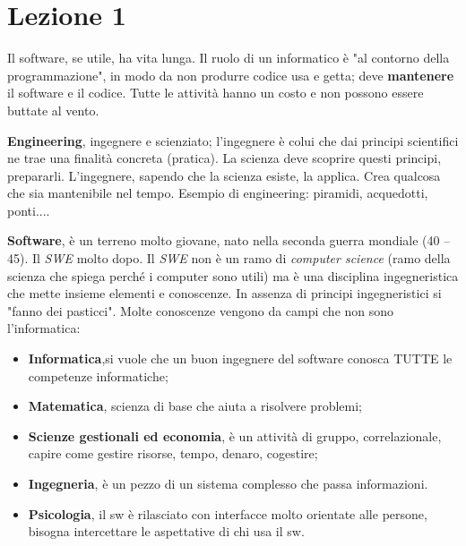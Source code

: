 





\section{Lezione 1}


Il software, se utile, ha vita lunga.
Il ruolo di un informatico è "al contorno della programmazione", in modo da non produrre codice usa e getta; deve \textbf{mantenere} il software e il codice. Tutte le attività hanno un costo e non possono essere buttate al vento.

\textbf{Engineering}, ingegnere e scienziato; l'ingegnere è colui che dai principi scientifici ne trae una finalità concreta (pratica). La scienza deve scoprire questi principi, prepararli. L'ingegnere, sapendo che la scienza esiste, la applica. Crea qualcosa che sia mantenibile nel tempo. Esempio di engineering: piramidi, acquedotti, ponti....

\textbf{Software}, è un terreno molto giovane, nato nella seconda guerra mondiale (40 – 45). Il \textit{SWE} molto dopo. Il \textit{SWE} non è un ramo di \textit{computer science} (ramo della scienza che spiega perché i computer sono utili) ma è una disciplina ingegneristica che mette insieme elementi e conoscenze. In assenza di principi ingegneristici si "fanno dei pasticci". Molte conoscenze vengono da campi che non sono l'informatica:

\begin{itemize}

	\item \textbf{Informatica},si vuole che un buon ingegnere del software conosca TUTTE le competenze informatiche;
	\item \textbf{Matematica}, scienza di base che aiuta a risolvere problemi;
	\item \textbf{Scienze gestionali ed economia}, è un attività di gruppo, correlazionale, capire come gestire risorse, tempo, denaro, cogestire;
	\item \textbf{Ingegneria}, è un pezzo di un sistema complesso che passa informazioni.
	\item \textbf{Psicologia}, il sw è rilasciato con interfacce molto orientate alle persone, bisogna intercettare le aspettative di chi usa il sw.

\end{itemize}

